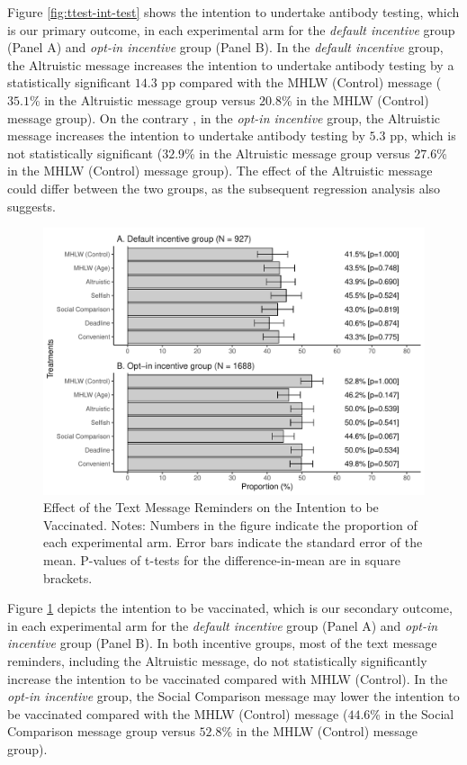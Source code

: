 \documentclass[
      12pt,
    a4paper
]{article}
\begin{document}
Figure \ref{fig:ttest-int-test} shows the intention to undertake antibody testing, which is our primary outcome, in each experimental arm for the \emph{default incentive} group (Panel A) and \emph{opt-in incentive} group (Panel B). In the \emph{default incentive} group, the Altruistic message increases the intention to undertake antibody testing by a statistically significant \(14.3\) pp compared with the MHLW (Control) message (\(35.1\)\% in the Altruistic message group versus \(20.8\)\% in the MHLW (Control) message group). On the contrary , in the \emph{opt-in incentive} group, the Altruistic message increases the intention to undertake antibody testing by \(5.3\) pp, which is not statistically significant (\(32.9\)\% in the Altruistic message group versus \(27.6\)\% in the MHLW (Control) message group). The effect of the Altruistic message could differ between the two groups, as the subsequent regression analysis also suggests.

\begin{figure}[t]
\includegraphics{Main-Document-LaTeX_files/figure-latex/ttest-int-vacc-1} \caption{Effect of the Text Message Reminders on the Intention to be Vaccinated. Notes: Numbers in the figure indicate the proportion of each experimental arm. Error bars indicate the standard error of the mean. P-values of t-tests for the difference-in-mean are in square brackets.}\label{fig:ttest-int-vacc}
\end{figure}

Figure \ref{fig:ttest-int-vacc} depicts the intention to be vaccinated, which is our secondary outcome, in each experimental arm for the \emph{default incentive} group (Panel A) and \emph{opt-in incentive} group (Panel B). In both incentive groups, most of the text message reminders, including the Altruistic message, do not statistically significantly increase the intention to be vaccinated compared with MHLW (Control). In the \emph{opt-in incentive} group, the Social Comparison message may lower the intention to be vaccinated compared with the MHLW (Control) message (\(44.6\)\% in the Social Comparison message group versus \(52.8\)\% in the MHLW (Control) message group).
\end{document}
